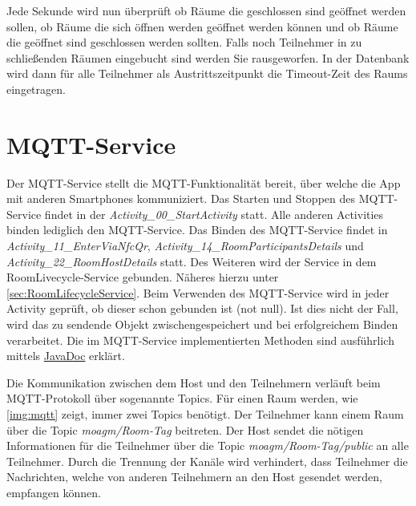 Jede Sekunde wird nun überprüft ob Räume die geschlossen sind geöffnet werden sollen, ob Räume die sich öffnen werden geöffnet werden können und ob Räume die geöffnet sind geschlossen werden sollten. 
Falls noch Teilnehmer in zu schließenden Räumen eingebucht sind werden Sie rausgeworfen. In der Datenbank wird dann für alle Teilnehmer als Austrittszeitpunkt die Timeout-Zeit des Raums eingetragen.



\section{MQTT-Service}
\label{sec:MQTT Service}
Der MQTT-Service stellt die MQTT-Funktionalität bereit, über welche die App mit anderen Smartphones kommuniziert.
Das Starten und Stoppen des MQTT-Service findet in der \textit{Activity\_00\_StartActivity} statt. 
Alle anderen Activities binden lediglich den MQTT-Service. Das Binden des MQTT-Service findet in  \textit{Activity\_11\_EnterViaNfcQr}, \textit{Activity\_14\_RoomParticipantsDetails} und \textit{Activity\_22\_RoomHostDetails} statt. 
Des Weiteren wird der Service in dem RoomLivecycle-Service gebunden. 
Näheres hierzu unter \cref{sec:RoomLifecycleService}.  
Beim Verwenden des MQTT-Service wird in jeder Activity geprüft, ob dieser schon gebunden ist (not null). 
Ist dies nicht der Fall, wird das zu sendende Objekt zwischengespeichert und bei erfolgreichem Binden verarbeitet. 
Die im MQTT-Service implementierten Methoden sind ausführlich mittels \href{https://scm.inftech.hs-mannheim.de/gogs/moa/20moagm/src/dev/Doku/javadoc}{JavaDoc} erklärt. 

Die Kommunikation zwischen dem Host und den Teilnehmern verläuft beim MQTT-Protokoll über sogenannte Topics. 
Für einen Raum werden, wie \cref{img:mqtt} zeigt, immer zwei Topics benötigt. 
Der Teilnehmer kann einem Raum über die Topic \textit{moagm/Room-Tag} beitreten. 
Der Host sendet die nötigen Informationen für die Teilnehmer über die Topic \textit{moagm/Room-Tag/public} an alle Teilnehmer. 
Durch die Trennung der Kanäle wird verhindert, dass Teilnehmer die Nachrichten, welche von anderen Teilnehmern an den Host gesendet werden, empfangen können.

